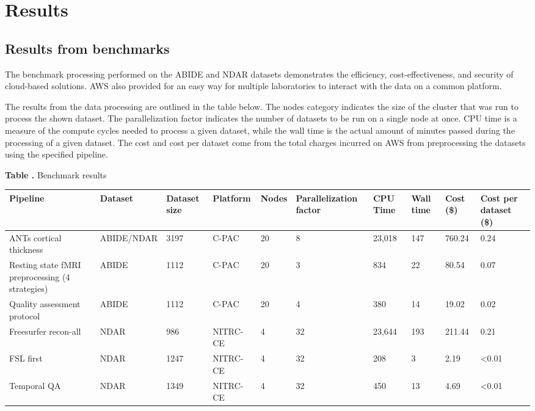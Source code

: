 \documentclass{frontiersSCNS} %
\begin{document}
\section{Results}

\subsection{Results from benchmarks}
The benchmark processing performed on the ABIDE and NDAR datasets demonstrates the efficiency, cost-effectiveness, and security of cloud-based solutions. AWS also provided for an easy way for multiple laboratories to interact with the data on a common platform.

The results from the data processing are outlined in the table below. The nodes category indicates the size of the cluster that was run to process the shown dataset. The parallelization factor indicates the number of datasets to be run on a single node at once. CPU time is a measure of the compute cycles needed to process a given dataset, while the wall time is the actual amount of minutes passed during the processing of a given dataset. The cost and cost per dataset come from the total charges incurred on AWS from preprocessing the datasets using the specified pipeline.

\begin{table}[!ht]
\textbf{\label{Tab:02} Table .}{ Benchmark results}

\processtable{}
{\begin{tabular}{llllllllll}
        Pipeline & Dataset & Dataset size & Platform & Nodes & Parallelization factor & CPU Time & Wall time & Cost (\$) & Cost per dataset (\$)\\\midrule
        ANTs cortical thickness & ABIDE/NDAR & 3197 & C-PAC & 20 & 8 & 23,018 & 147 & 760.24 & 0.24\\
        Resting state fMRI preprocessing (4 strategies) & ABIDE & 1112 & C-PAC & 20 & 3 & 834 & 22 & 80.54 & 0.07\\
        Quality assessment protocol & ABIDE & 1112 & C-PAC & 20 & 4 & 380 & 14 & 19.02 & 0.02\\
        Freesurfer recon-all & NDAR & 986 & NITRC-CE & 4 & 32 & 23,644 & 193 & 211.44 & 0.21\\
        FSL first & NDAR & 1247 & NITRC-CE & 4 & 32 & 208 & 3 & 2.19 & <0.01 \\
        Temporal QA & NDAR & 1349 & NITRC-CE & 4 & 32 & 450 & 13 & 4.69 & <0.01
\end{tabular}}{}
\end{table}
\end{document}
